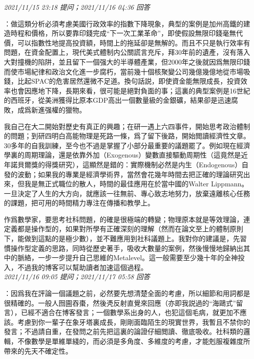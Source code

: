 \documentclass[twocolumn]{ctexart}
\begin{document}
\textit{\hfill\noindent\small 2021/11/15 23:18 提问；2021/11/16 04:36 回答}

：做這類分析必須考慮美國行政效率的指數下降現象，典型的案例是加州高鐵的建造時程和價格，所以要靠印錢完成“下一次工業革命”，即使假設無限印錢毫無代價，可以指數性地提高投資額，時間上的拖延卻是無解的。而且不只是執行效率有問題，在資金配置上，現代美式體制内公關謊言充斥，拜30年前的遺產，沒有落入大對撞機的陷阱，並且留下一個强大的半導體產業，但2000年之後就因爲無限印錢而使市場紀律和政治文化進一步腐朽，當前幾十個核聚變公司幾億幾億地從市場吸錢，比起SPAC的危害居然還微不足道。換句話説，即使資金能無限成長，投資效率也會因應地下降，長期來看，很可能是絕對負面的事；這裏的典型案例是16世紀的西班牙，從美洲獲得比原本GDP高出一個數量級的金銀礦，結果卻是迅速腐敗，成爲新進强權的獵物。

我自己在大二開始對歷史有真正的興趣；在研一遇上六四事件，開始思考政治體制的問題；到研四明白高能物理是死路一條，爲了留下後路，開始閲讀經濟性文章。30多年的自我訓練，至今也不過是掌握了小部分最重要的議題罷了。例如現在經濟學裏的周期理論，還是依靠外加（Exogenous）變數直接驅動周期性（這竟然是近年諾貝爾獎的得獎研究），這顯然是錯的：實際機制必然是内生（Endogenous）自發的波動；如果我的專業是經濟學術界，當然會花幾年時間去把正確的理論研究出來，但我是無正式職位的散人，時間的最佳應用在於當中國的Walter Lippmann。一旦決定了人生的大方向，就應該一往無前、專心致志地努力，放棄遠離核心任務的課題，把可用的時間精力專注在傳播和教學上。

作爲數學家，要思考社科問題，的確是很極端的轉變；物理原本就是等效理論，連定義都是操作型的，如果對所學有正確深刻的理解（然而在論文至上的體制原則下，能做到這點的是極少數），並不難應用到社科議題上。我對你的建議是，先習慣操作型定義的思路，同時從歷史著手，吸收大數量的案例，然後慢慢地歸納出其中的脈絡，一步一步提升自己思維的Metalevel。這一般需要至少幾十年的全神投入，不過我的博客可以幫助讀者加速這個過程。
\\

\textit{\hfill\noindent\small 2021/11/16 09:05 提问；2021/11/17 05:58 回答}

：因爲我在評論一個議題之前，必然要先想清楚全面的考慮，所以細節和用詞都是很精確的。一般人囫圇吞棗，然後凴反射直覺來回應（亦即我説過的“海鷗式”留言），已經不適合在博客發言；一個數學系出身的人，也犯這個毛病，就更加不應該。考慮到你一輩子在象牙塔裏成長，剛剛面臨陌生的現實世界，我暫且不禁你的發言；不過請自重，在發問之前先把這裏的論證仔細閲讀、徹底吸收。社科類的邏輯，不像數學是單維單綫的，而必須是多角度、多維度的考慮，才能剋服複雜度所帶來的先天不確定性。
\end{document}
